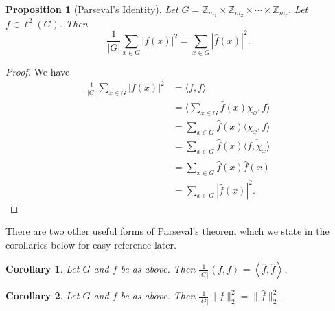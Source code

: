 \documentclass[12pt]{article}
\newtheorem{Proposition}{Proposition}
\newtheorem{Corollary}{Corollary}
\newcommand{\Z}{\mathbb{Z}}
\newcommand{\Zm}{\Z_{m_1}\times \Z_{m_2} \times \cdots \times \Z_{m_r}}
\begin{document}
\begin{Proposition}[Parseval's Identity] %
    Let $G = \Zm$.
    Let $f\in \ell^2(G)$.
    Then
    \[
        \frac{1}{|G|}\sum_{x\in G}|f(x)|^2 = \sum_{x \in G}|\widehat{f}(x)|^2.
    \]
\end{Proposition}
\begin{proof}
    We have
    \begin{align*}
        \frac{1}{|G|}\sum_{x\in G}|f(x)|^2
          & = \langle f, f \rangle                                            \\
          & = \langle \sum_{x\in G}\widehat{f}(x)\chi_x , f \rangle           \\
          & = \sum_{x\in G} \widehat{f}(x)\langle \chi_x ,f\rangle            \\
          & = \sum_{x\in G} \widehat{f}(x)\overline{\langle f, \chi_x\rangle} \\
          & = \sum_{x\in G} \widehat{f}(x)\overline{\widehat{f}(x)}           \\
          & = \sum_{x\in G}|\widehat{f}(x)|^2.
    \end{align*}
\end{proof}
There are two other useful forms of Parseval's theorem which we state in the corollaries below for easy reference later.
\begin{Corollary}
    Let $G$ and $f$ be as above. Then $\frac{1}{|G|}\left<f,f\right> = \left<\widehat{f}, \widehat{f}\right>$.
\end{Corollary}
\begin{Corollary}
    Let $G$ and $f$ be as above. Then $\frac{1}{|G|}\| f\|_2^2 = \|\widehat{f}\|_2^2$.
\end{Corollary}
\end{document}
